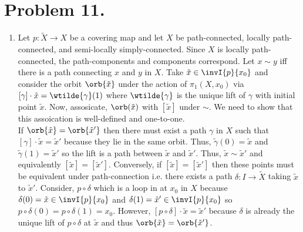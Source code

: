 \documentclass[12pt]{extarticle}
\begin{document}
\section*{Problem 11.}

\begin{enumerate}
\item Let $p : \tilde{X} \to X$ be a covering map and let $X$ be path-connected, locally path-connected, and semi-locally simply-connected. Since $X$ is locally path-connected, the path-components and components correspond. Let $x \sim y$ iff there is a path connecting $x$ and $y$ in $X$. Take $\tilde{x} \in \invI{p}{x_0}$ and consider the orbit $\orb{\tilde{x}}$ under the action of $\pi_1(X, x_0)$ via $[\gamma] \cdot \tilde{x} = \wtilde{\gamma}(1)$ where $\wtilde{\gamma}$ is the unique lift of $\gamma$ with initial point $\tilde{x}$. Now, assosicate, $\orb(\tilde{x})$ with $[\tilde{x}]$ under $\sim$. We need to show that this assoication is well-defined and one-to-one. \bigskip \\
If $\orb{\tilde{x}} = \orb{\tilde{x}'}$ then there must exist a path $\gamma$ in $X$ such that $[\gamma] \cdot \tilde{x} = \tilde{x}'$ because they lie in the same orbit. Thus, $\tilde{\gamma}(0) = \tilde{x}$ and $\tilde{\gamma}(1) = \tilde{x}'$ so the lift is a path between $\tilde{x}$ and $\tilde{x}'$. Thus, $\tilde{x} \sim \tilde{x}'$ and equivalently $[\tilde{x}] = [\tilde{x}']$. Conversely, if $[\tilde{x}] = [\tilde{x}']$ then these points must be equivalent under path-connection i.e. there exists a path $\delta : I \to \tilde{X}$ taking $\tilde{x}$ to $\tilde{x}'$. Consider, $p \circ \delta$ which is a loop in at $x_0$ in $X$ because $\delta(0) = \tilde{x} \in \invI{p}{x_0}$ and $\delta(1) = \tilde{x}' \in \invI{p}{x_0}$ so $p \circ \delta(0) = p \circ \delta(1) = x_0$. However, $[p \circ \delta] \cdot \tilde{x} = \tilde{x}'$ because $\delta$ is already the unique lift of $p \circ \delta$ at $\tilde{x}$ and thus $\orb{\tilde{x}} = \orb{\tilde{x}'}$.


\end{enumerate}
\end{document}
